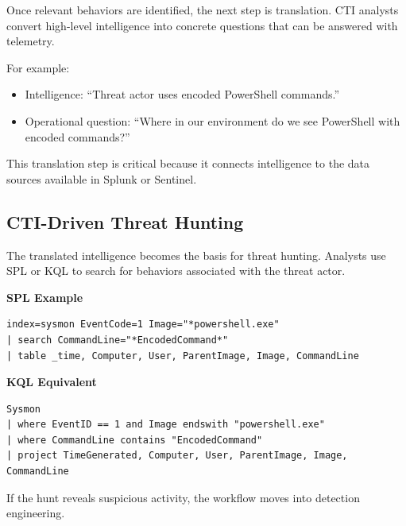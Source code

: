 Once relevant behaviors are identified, the next step is translation. CTI analysts convert high-level intelligence 
into concrete questions that can be answered with telemetry.

For example:

\begin{itemize}
    \item Intelligence: “Threat actor uses encoded PowerShell commands.”
    \item Operational question: “Where in our environment do we see PowerShell with encoded commands?”
\end{itemize}

This translation step is critical because it connects intelligence to the data sources available in Splunk or Sentinel.


\subsection*{CTI-Driven Threat Hunting}

The translated intelligence becomes the basis for threat hunting. Analysts use SPL or KQL to search for behaviors 
associated with the threat actor.

\textbf{SPL Example}

\begin{lstlisting}
index=sysmon EventCode=1 Image="*powershell.exe"
| search CommandLine="*EncodedCommand*"
| table _time, Computer, User, ParentImage, Image, CommandLine
\end{lstlisting}

\textbf{KQL Equivalent}

\begin{lstlisting}
Sysmon
| where EventID == 1 and Image endswith "powershell.exe"
| where CommandLine contains "EncodedCommand"
| project TimeGenerated, Computer, User, ParentImage, Image, CommandLine
\end{lstlisting}

If the hunt reveals suspicious activity, the workflow moves into detection engineering.


